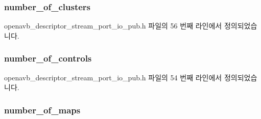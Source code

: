 \subsubsection[{\texorpdfstring{number\+\_\+of\+\_\+clusters}{number_of_clusters}}]{ number\+\_\+of\+\_\+clusters}\hypertarget{structopenavb__aem__descriptor__stream__port__io__t_a730f51131a874beaf03eeca3f089feec}{}\label{structopenavb__aem__descriptor__stream__port__io__t_a730f51131a874beaf03eeca3f089feec}


openavb\+\_\+descriptor\+\_\+stream\+\_\+port\+\_\+io\+\_\+pub.\+h 파일의 56 번째 라인에서 정의되었습니다.

\subsubsection[{\texorpdfstring{number\+\_\+of\+\_\+controls}{number_of_controls}}]{ number\+\_\+of\+\_\+controls}\hypertarget{structopenavb__aem__descriptor__stream__port__io__t_ab8a96da60faf5e9dfdef4464fbfd5288}{}\label{structopenavb__aem__descriptor__stream__port__io__t_ab8a96da60faf5e9dfdef4464fbfd5288}


openavb\+\_\+descriptor\+\_\+stream\+\_\+port\+\_\+io\+\_\+pub.\+h 파일의 54 번째 라인에서 정의되었습니다.

\subsubsection[{\texorpdfstring{number\+\_\+of\+\_\+maps}{number_of_maps}}]{ number\+\_\+of\+\_\+maps}\hypertarget{structopenavb__aem__descriptor__stream__port__io__t_ac27f7ac6db370cdf63a7d34635c5601d}{}\label{structopenavb__aem__descriptor__stream__port__io__t_ac27f7ac6db370cdf63a7d34635c5601d}


